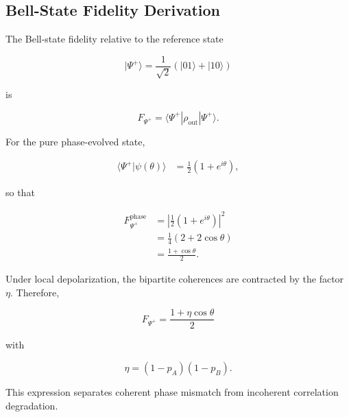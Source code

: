 \medskip


\subsection{Bell-State Fidelity Derivation}

The Bell-state fidelity relative to the reference state

\[
|\Psi^+\rangle
=
\frac1{\sqrt2}
(|01\rangle+|10\rangle)
\]

is

\begin{equation}
F_{\Psi^+}
=
\langle\Psi^+|
\rho_{\mathrm{out}}
|\Psi^+\rangle.
\end{equation}

\medskip

For the pure phase-evolved state,

\begin{align}
\langle\Psi^+|\psi(\theta)\rangle
&=
\frac12
\left(
1+e^{i\theta}
\right),
\end{align}

so that

\begin{align}
F_{\Psi^+}^{\mathrm{phase}}
&=
\left|
\frac12
(1+e^{i\theta})
\right|^2
\nonumber
\\
&=
\frac14
(2+2\cos\theta)
\nonumber
\\
&=
\frac{1+\cos\theta}{2}.
\label{eq:d5_phase_fidelity}
\end{align}

\medskip

Under local depolarization, the bipartite coherences are contracted by the factor \( \eta \). Therefore,

\begin{equation}
\boxed{
F_{\Psi^+}
=
\frac{1+\eta\cos\theta}{2}
}
\label{eq:d5_final_fidelity}
\end{equation}

with

\[
\eta=(1-p_A)(1-p_B).
\]

\medskip

This expression separates coherent phase mismatch from incoherent correlation degradation.

\medskip


